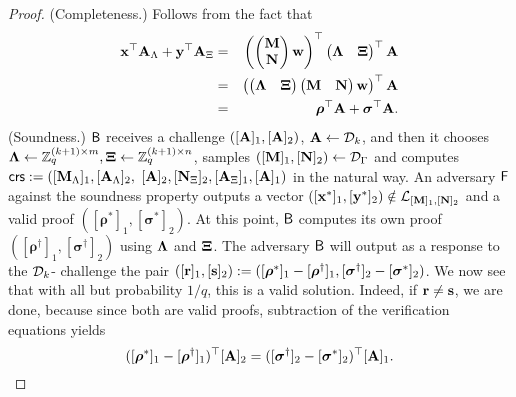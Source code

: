 \begin{proof}
(Completeness.) Follows from the fact that
\begin{eqnarray*}
\mathbf{x}^\top\mathbf{{A}}_\Lambda+\mathbf{y}^\top\mathbf{{A}}_\Xi
& = &
\left(
\begin{pmatrix}\mathbf{{M}}\\\mathbf{{N}}\end{pmatrix}\mathbf{w}
\right)^\top
\begin{pmatrix}\mathbf{{\Lambda}}& \mathbf{{\Xi}}\end{pmatrix}^\top
\mathbf{{A}}\\
& = &
\left(
\begin{pmatrix}\mathbf{{\Lambda}}&\mathbf{{\Xi}}\end{pmatrix}
\begin{pmatrix}\mathbf{{M}}&\mathbf{{N}}\end{pmatrix}\mathbf{w}
\right)^\top
\mathbf{{A}}\\
& = &
{\boldsymbol \rho}^\top\mathbf{{A}}+{\boldsymbol \sigma}^\top\mathbf{{A}}.
\end{eqnarray*}
(Soundness.) $\mathsf{B}$ receives a challenge $([\mathbf{{A}}]_1,[\mathbf{{A}}]_2)$, $\mathbf{{A}} \gets \mathcal{D}_k$, and then it chooses $\mathbf{{\Lambda}}\gets\mathbb{Z}_q^{(k+1)\times m},\mathbf{{\Xi}}\gets\mathbb{Z}_q^{(k+1)\times n}$, samples $([\mathbf{{M}}]_1,[\mathbf{{N}}]_2) \gets \mathcal{D}_{\Gamma}$ and computes 
   $\mathsf{crs}:=([\mathbf{{M}}_{\Lambda}]_1, [\mathbf{{A}}_\Lambda]_2 ,$ $[\mathbf{{A}}]_2, [\mathbf{{N}}_{\Xi}]_2,[\mathbf{{A}}_{\Xi}]_1,[\mathbf{{A}}]_1)$ in the natural way.
An adversary $\mathsf{F}$ against the soundness property outputs a vector $([{\mathbf{x}}^*]_1,[\mathbf{y}^*]_2) \notin \mathcal{L}_{[\mathbf{{M}}]_1,[\mathbf{{N}}]_2}$ and a valid proof
$([{\boldsymbol \rho}^{*}]_1, [{\boldsymbol \sigma}^{*}]_2)$. At this point, $\mathsf{B}$ computes its own proof $([{\boldsymbol \rho}^{\dagger}]_1, [{\boldsymbol \sigma}^{\dagger}]_2)$ using $\mathbf{{\Lambda}}$ and $\mathbf{{\Xi}}$. The adversary $\mathsf{B}$ will output as a response to the $\mathcal{D}_k$-\skermdh{} challenge the pair $([\mathbf{r}]_1,[\mathbf{s}]_2):=([{\boldsymbol \rho}^{*}]_1-[{\boldsymbol \rho}^{\dagger}]_1,[{  \boldsymbol \sigma}^{\dagger}]_2-[{\boldsymbol \sigma}^{*}]_2)$. We now see that with all but probability $1/q$, this is a valid 
solution. Indeed, if $\mathbf{r} \neq \mathbf{s}$, we are done, because since both are valid proofs, subtraction of the verification equations yields
\begin{equation*}
([{\boldsymbol \rho}^{*}]_1-[{\boldsymbol \rho}^{\dagger}]_1)^{\top} [\mathbf{{A}}]_2=  ([{\boldsymbol \sigma}^{\dagger}]_2-[{\boldsymbol \sigma}^{*}]_2)^{\top} [\mathbf{{A}}]_1.
\end{equation*}

\end{proof}
